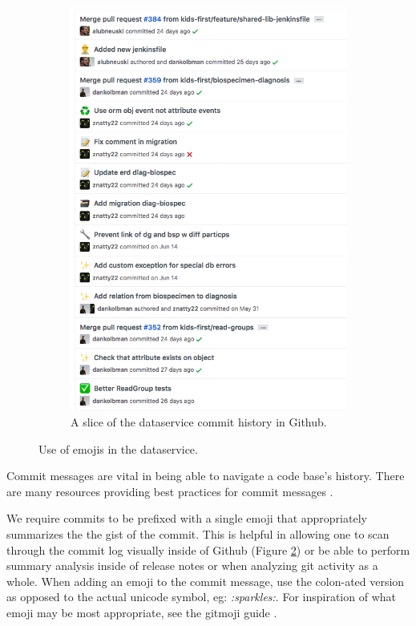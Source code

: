 \documentclass[a4paper,12pt,titlepage]{scrartcl}
\begin{document}
\begin{figure}
\begin{subfigure}[h]{0.4\textwidth}
    		\includegraphics[width=\textwidth]{images/commithistory.png}
    		\caption{A slice of the dataservice commit history in Github.}
    		\label{fig:commithistory}
    	\end{subfigure}
    	\caption{Use of emojis in the dataservice.}
   	\end{figure}	
	
	Commit messages are vital in being able to navigate a code base's history.
	There are many resources providing best practices for commit messages \cite{beams, socommits}.
	
	We require commits to be prefixed with a single emoji that appropriately summarizes the the gist of the commit.
	This is helpful in allowing one to scan through the commit log visually inside of Github (Figure \ref{fig:commithistory}) or be able to perform summary analysis inside of release notes or when analyzing git activity as a whole.
	When adding an emoji to the commit message, use the colon-ated version as opposed to the actual unicode symbol, eg: {\em :sparkles:}.
	For inspiration of what emoji may be most appropriate, see the gitmoji guide \cite{gitmoji}.
	
\end{document}
